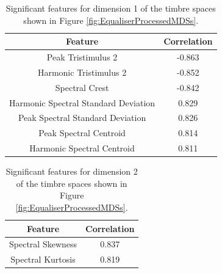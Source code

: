 		\begin{table}[h!]
			\centering
			\begin{tabular}{|c|c|}
				\hline
				\bf{Feature} & \bf{Correlation} \\
				\hline
				\hline
				Peak Tristimulus 2 & -0.863 \\
				\hline
				Harmonic Tristimulus 2 & -0.852 \\
				\hline
				Spectral Crest & -0.842 \\
				\hline
				Harmonic Spectral Standard Deviation &  0.829 \\
				\hline
				Peak Spectral Standard Deviation &  0.826 \\
				\hline
				Peak Spectral Centroid &  0.814 \\
				\hline
				Harmonic Spectral Centroid &  0.811 \\
				\hline
			\end{tabular}
			\caption{Significant features for dimension 1 of the timbre spaces shown in Figure 
				 \ref{fig:EqualiserProcessedMDSs}.}
			\label{tab:EqualiserProcessedFeaturesDim1}
		\end{table}

		\begin{table}[h!]
			\centering
			\begin{tabular}{|c|c|}
				\hline
				\bf{Feature} & \bf{Correlation} \\
				\hline
				\hline
				Spectral Skewness & 0.837 \\
				\hline
				Spectral Kurtosis & 0.819 \\
				\hline
			\end{tabular}
			\caption{Significant features for dimension 2 of the timbre spaces shown in Figure 
				 \ref{fig:EqualiserProcessedMDSs}.}
			\label{tab:EqualiserProcessedFeaturesDim2}
		\end{table}

